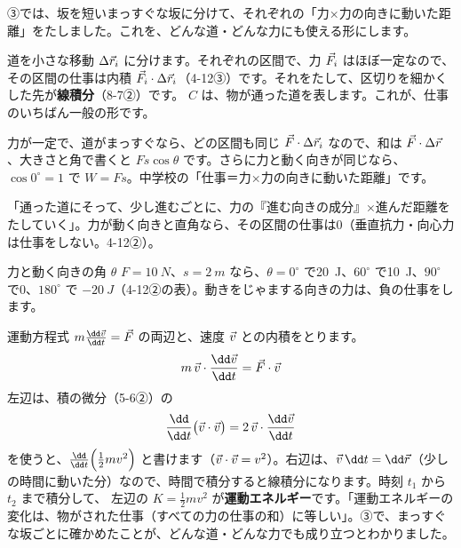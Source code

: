 
\label{ph:力-4:sec4}
③では、坂を短いまっすぐな坂に分けて、それぞれの「力×力の向きに動いた距離」をたしました。これを、どんな道・どんな力にも使える形にします。

道を小さな移動 $\Delta\vec{r}_i$ に分けます。それぞれの区間で、力 $\vec{F}_i$ はほぼ一定なので、その区間の仕事は内積 $\vec{F}_i\cdot\Delta\vec{r}_i$（\mbox{4-12③}）です。それをたして、区切りを細かくした先が\textbf{線積分}（\mbox{8-7②}）です。
$C$ は、物が通った道を表します。これが、仕事のいちばん一般の形です。

\begin{phflow}[仕事]
\end{phflow}
\label{ph:力-4:cos}力が一定で、道がまっすぐなら、どの区間も同じ $\vec{F}\cdot\Delta\vec{r}_i$ なので、和は $\vec{F}\cdot\Delta\vec{r}$、大きさと角で書くと $Fs\cos\theta$ です。\label{ph:力-4:shigoto}さらに力と動く向きが同じなら、$\cos0^\circ=1$ で $W=Fs$。中学校の「仕事＝力×力の向きに動いた距離」です。

\begin{phyomi}[$W=\displaystyle\int_C\pxev F\cdot\dd\pxev r$]
「通った道にそって、少し進むごとに、力の『進む向きの成分』×進んだ距離をたしていく」。力が動く向きと直角なら、その区間の仕事は0（垂直抗力・向心力は仕事をしない。\mbox{4-12②}）。
\end{phyomi}

\begin{phbaisuru}[いろいろな角]{力と動く向きの角 $\theta$}
$F=\qty{10}{N}$、$s=\qty{2}{m}$ なら、$\theta=0^\circ$ で\qty{20}{J}、$60^\circ$ で\qty{10}{J}、$90^\circ$ で0、$180^\circ$ で $\qty{-20}{J}$（\mbox{4-12②}の表）。動きをじゃまする向きの力は、負の仕事をします。
\end{phbaisuru}

\label{ph:力-4:sec5}
運動方程式 $m\tfrac{\dd\pxev v}{\dd t}=\pxev F$ の両辺と、速度 $\vec{v}$ との内積をとります。
\[m\,\pxev v\cdot\frac{\dd\pxev v}{\dd t}=\pxev F\cdot\pxev v\]
左辺は、積の微分（\mbox{5-6②}）の
\[\frac{\dd}{\dd t}\bigl(\pxev v\cdot\pxev v\bigr)=2\,\pxev v\cdot\frac{\dd\pxev v}{\dd t}\]
を使うと、$\tfrac{\dd}{\dd t}\Bigl(\tfrac{1}{2}mv^2\Bigr)$ と書けます（$\vec{v}\cdot\vec{v}=v^2$）。右辺は、$\pxev v\,\dd t=\dd\pxev r$（少しの時間に動いた分）なので、時間で積分すると線積分になります。時刻 $t_1$ から $t_2$ まで積分して、
\label{ph:力-4:undou}左辺の $K=\tfrac{1}{2}mv^2$ が\textbf{運動エネルギー}です。「運動エネルギーの変化は、物がされた仕事（すべての力の仕事の和）に等しい」。③で、まっすぐな坂ごとに確かめたことが、どんな道・どんな力でも成り立つとわかりました。

